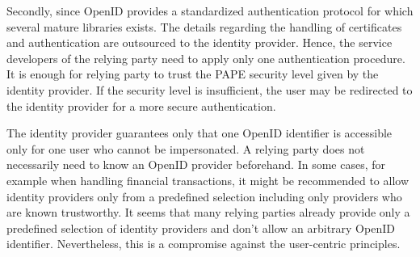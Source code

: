 \documentclass{tktltiki}
\begin{document}
      Secondly, since OpenID provides a standardized authentication protocol for which several mature libraries exists. The details regarding the handling of certificates and authentication are outsourced to the identity provider. Hence, the service developers of the relying party need to apply only one authentication procedure. It is enough for relying party to trust the PAPE security level given by the identity provider. If the security level is insufficient, the user may be redirected to the identity provider for a more secure authentication.
      
      The identity provider guarantees only that one OpenID identifier is accessible only for one user who cannot be impersonated. A relying party does not necessarily need to know an OpenID provider beforehand. In some cases, for example when handling financial transactions, it might be recommended to allow identity providers only from a predefined selection including only providers who are known trustworthy. It seems that many relying parties already provide only a predefined selection of identity providers and don't allow an arbitrary OpenID identifier. Nevertheless, this is a compromise against the user-centric principles.
      
      
      
 


\lastpage
\end{document}
